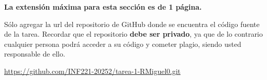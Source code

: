 \begin{mdframed}
    \textbf{La extensión máxima para esta sección es de 1 página.}
\end{mdframed}


Sólo agregar la url del repositorio de GitHub donde se encuentra el código fuente de la tarea. Recordar que el repositorio \textbf{debe ser privado}, ya que de lo contrario cualquier persona podrá acceder a su código y cometer plagio, siendo usted responsable de ello. 

\begin{mdframed}
    \begin{center}
        {\Large \url{https://github.com/INF221-20252/tarea-1-RMiguel0.git}}
    \end{center}
\end{mdframed}


